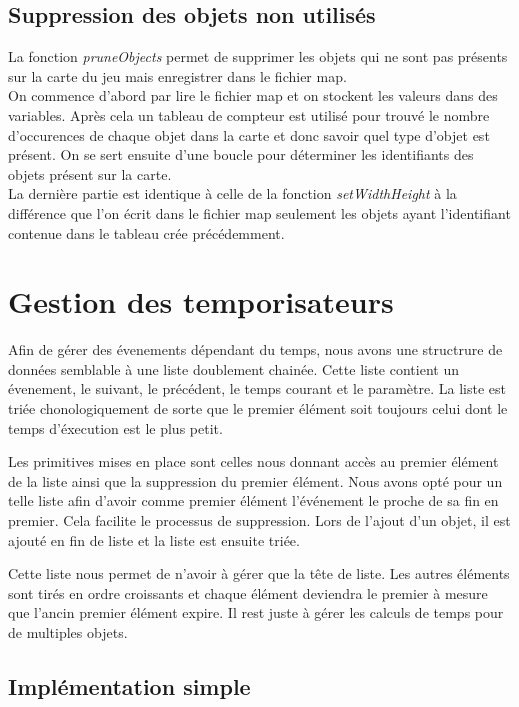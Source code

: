 \documentclass[10pt,a4paper]{article}
\begin{document}
\subsection{Suppression des objets non utilisés}
\quad La fonction \textit{pruneObjects} permet de supprimer les objets qui ne sont pas présents sur la carte du jeu mais enregistrer dans le fichier map.\\
\quad On commence d'abord par lire le fichier map et on stockent les valeurs dans des variables. Après cela un tableau de compteur est utilisé pour trouvé le nombre d'occurences de chaque objet dans la carte et donc savoir quel type d'objet est présent. On se sert ensuite d'une boucle pour déterminer les identifiants des objets présent sur la carte.\\
La dernière partie est identique à celle de la fonction \textit{setWidthHeight} à la différence que l'on écrit dans le fichier map seulement les objets ayant l'identifiant contenue dans le tableau crée précédemment.
 
\section{Gestion des temporisateurs}

	Afin de gérer des évenements dépendant du temps, nous avons une structrure de données semblable à une liste doublement chainée. Cette liste contient un évenement, le suivant, le précédent, le temps courant et le paramètre. La liste est triée chonologiquement de sorte que le premier élément soit toujours celui dont le temps d'éxecution est le plus petit. 
	
	Les primitives mises en place sont celles nous donnant accès au premier élément de la liste ainsi que la suppression du premier élément. Nous avons opté pour un telle liste afin d'avoir comme premier élément l'événement le proche de sa fin en premier. Cela facilite le processus de suppression. Lors de l'ajout d'un objet, il est ajouté en fin de liste et la liste est ensuite triée.
	
	Cette liste nous permet de n'avoir à gérer que la tête de liste. Les autres éléments sont tirés en ordre croissants et chaque élément deviendra le premier à mesure que l'ancin premier élément expire. Il rest juste à gérer les calculs de temps pour de multiples objets.

\subsection{Implémentation simple}
\end{document}
